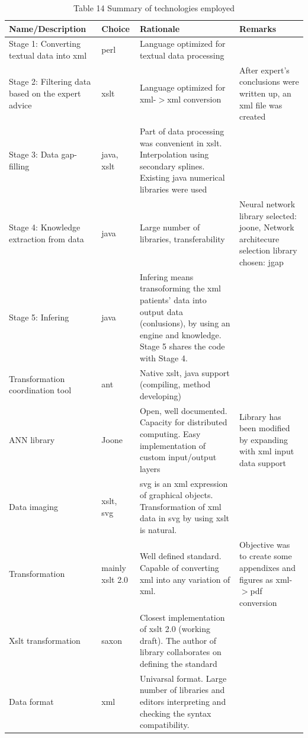 \documentclass[10pt,oneside]{memoir}
\begin{document}
\begin{table}[htbp]
\begin{minipage}{\linewidth}
\setlength{\tymax}{0.5\linewidth}
\centering
\small
\caption{Table 14 Summary of technologies employed}
\label{table14}
\begin{tabulary}{\linewidth}{@{}llll@{}} \\ \toprule 
Name/Description&Choice&Rationale&Remarks \\\midrule
Stage 1: Converting textual data into xml&perl&Language optimized for textual data processing& \\
Stage 2: Filtering data based on the expert advice&xslt&Language optimized for xml-$>$xml conversion&After expert's conclusions were written up, an xml file was created \\
Stage 3: Data gap-filling&java, xslt&Part of data processing was convenient in xslt. Interpolation using secondary splines. Existing java numerical libraries were used& \\
Stage 4: Knowledge extraction from data&java&Large number of libraries, transferability&Neural network library selected: joone, Network architecure selection library chosen: jgap \\
Stage 5: Infering&java&Infering means transoforming the xml patients' data into output data (conlusions), by using an engine and knowledge. Stage 5 shares the code with Stage 4.& \\
Transformation coordination tool&ant&Native xslt, java support (compiling, method developing)& \\
ANN library&Joone&Open, well documented. Capacity for distributed computing. Easy implementation of custom input/output layers&Library has been modified by expanding with xml input data support \\
Data imaging&xslt, svg&svg is an xml expression of graphical objects. Transformation of xml data in svg by using xslt is natural.& \\
Transformation&mainly xslt 2.0&Well defined standard. Capable of converting xml into any variation of xml.&Objective was to create some appendixes and figures as xml-$>$pdf conversion \\
Xslt transformation&saxon&Closest implementation of xslt 2.0 (working draft). The author of library  collaborates on defining the standard& \\
Data format&xml&Univarsal format. Large number of libraries and editors interpreting and checking the syntax compatibility.& \\

		\bottomrule
	\end{tabulary}
\end{minipage}
\end{table}
\end{document}
